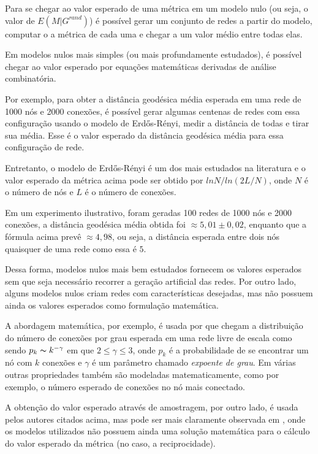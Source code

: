 \documentclass[12pt,a4paper]{article}
\theoremstyle{hypo}
\begin{document}
Para se chegar ao valor esperado de uma métrica em um modelo nulo (ou seja, o valor de $E(M|G^\textit{rand})$) é possível gerar um conjunto de redes a partir do modelo, computar o a métrica de cada uma e chegar a um valor médio entre todas elas.

Em modelos nulos mais simples (ou mais profundamente estudados), é possível chegar ao valor esperado por equações matemáticas derivadas de análise combinatória.

Por exemplo, para obter a distância geodésica média esperada em uma rede de 1000 nós e 2000 conexões, é possível gerar algumas centenas de redes com essa configuração usando o modelo de Erdős-Rényi, medir a distância de todas e tirar sua média. Esse é o valor esperado da distância geodésica média para essa configuração de rede.

Entretanto, o modelo de Erdős-Rényi é um dos mais estudados na literatura e o valor esperado da métrica acima pode ser obtido por $ln N / ln (2L / N)$, onde $N$ é o número de nós e $L$ é o número de conexões.

Em um experimento ilustrativo, foram geradas 100 redes de 1000 nós e 2000 conexões, a distância geodésica média obtida foi $\approx 5,01 \pm 0,02$, enquanto que a fórmula acima prevê $\approx 4,98$, ou seja, a distância esperada entre dois nós quaisquer de uma rede como essa é $5$.

Dessa forma, modelos nulos mais bem estudados fornecem os valores esperados sem que seja necessário recorrer a geração artificial das redes. Por outro lado, alguns modelos nulos criam redes com características desejadas, mas não possuem ainda os valores esperados como formulação matemática.

A abordagem matemática, por exemplo, é usada por  que chegam a distribuição do número de conexões por grau esperada em uma rede livre de escala como sendo $p_k \thicksim k^{-\gamma}$ em que $2 \leq \gamma \leq 3$, onde $p_k$ é a probabilidade de se encontrar um nó com $k$ conexões e $\gamma$ é um parâmetro chamado \textit{expoente de grau}. Em  várias outras propriedades também são modeladas matematicamente, como por exemplo, o número esperado de conexões no nó mais conectado.

A obtenção do valor esperado através de amostragem, por outro lado, é usada pelos autores citados acima, mas pode ser mais claramente observada em , onde os modelos utilizados não possuem ainda uma solução matemática para o cálculo do valor esperado da métrica (no caso, a reciprocidade).
\end{document}
